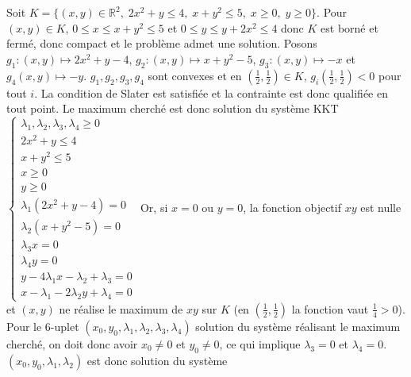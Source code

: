 \documentclass{report}
\begin{document}
\subsection{} \noindent{}\\ 
\\ 
\\
\noindent Soit $K=\{(x,y)\in \mathbb R^2, \; 2x^2+y\leq 4, \; x+y^2\leq 5,\; x\geq 0,\; y\geq 0\}$. Pour $(x,y)\in K$, $0\leq x\leq x+y^2\leq 5$ et $0\leq y \leq y+2x^2 \leq 4$ donc $K$ est borné et fermé, donc compact et le problème admet une solution. \newline
\newline 
Posons $g_1:(x,y)\mapsto 2x^2+y-4$, $g_2:(x,y)\mapsto x+y^2-5$, $g_3:(x,y)\mapsto -x$ et $g_4(x,y)\mapsto -y$. $g_1,g_2,g_3,g_4$ sont convexes et en $(\frac 12,\frac 12)\in K$, $g_i(\frac 12,\frac 12)<0$ pour tout $i$. La condition de Slater est satisfiée et la contrainte est donc qualifiée en tout point.\newline
Le maximum cherché est donc solution du système KKT \newline 
$\begin{cases}
\lambda_1,\lambda_2,\lambda_3,\lambda_4 \geq 0 \\
2x^2+y\leq 4 \\
x+y^2\leq 5 \\
x\geq 0 \\
y\geq 0 \\
\lambda_1 (2x^2+y -4)=0 \\
\lambda_2 (x+y^2- 5)=0 \\
\lambda_3 x =0 \\
\lambda_4 y =0 \\
y-4\lambda_1 x - \lambda_2 + \lambda_3 = 0 \\
x - \lambda_1 - 2 \lambda_2 y + \lambda_4 = 0
\end{cases}$\newline
\newline
Or, si $x=0$ ou $y=0$, la fonction objectif $xy$ est nulle et $(x,y)$ ne réalise le maximum de $xy$ sur $K$ (en $(\frac 12, \frac 12)$ la fonction vaut $\frac 14 >0$). Pour le $6$-uplet $(x_0,y_0,\lambda_1,\lambda_2,\lambda_3,\lambda_4)$ solution du système réalisant le maximum cherché, on doit donc avoir $x_0\neq 0$ et $y_0\neq 0$, ce qui implique $\lambda_3=0$ et $\lambda_4=0$. \newline $(x_0,y_0,\lambda_1,\lambda_2)$ est donc solution du système 
\end{document}
